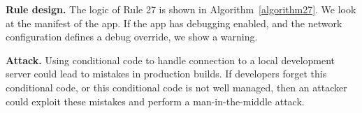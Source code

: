 \textbf{Rule design.} The logic of Rule 27 is shown in Algorithm~\ref{algorithm27}. We look at the manifest of the app. If the app has debugging enabled, and the network configuration defines a debug override, we show a warning. 

\setcounter{algocf}{26}
\begin{algorithm}[]
\SetAlgoLined
{}
\caption{}
\label{algorithm27}
\end{algorithm}

\textbf{Attack.} Using conditional code to handle connection to a local development server could lead to mistakes in production builds. If developers forget this conditional code, or this conditional code is not well managed, then an attacker could exploit these mistakes and perform a man-in-the-middle attack.

